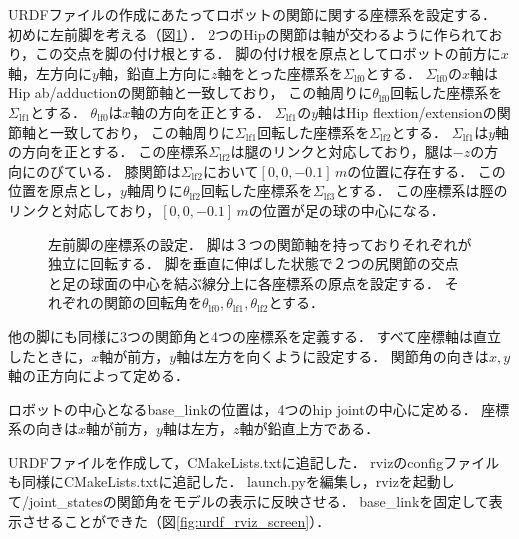 \documentclass[a4paper]{jlreq}
\begin{document}
  URDFファイルの作成にあたってロボットの関節に関する座標系を設定する．
  初めに左前脚を考える（図\ref{fig:lfleg_coords}）．
  2つのHipの関節は軸が交わるように作られており，この交点を脚の付け根とする．
  脚の付け根を原点としてロボットの前方に$x$軸，左方向に$y$軸，鉛直上方向に$z$軸をとった座標系を$\Sigma_\mathrm{lf0}$とする．
  $\Sigma_\mathrm{lf0}$の$x$軸はHip ab/adductionの関節軸と一致しており，
  この軸周りに$\theta_\mathrm{lf0}$回転した座標系を$\Sigma_\mathrm{lf1}$とする．
  $\theta_\mathrm{lf0}$は$x$軸の方向を正とする．
  $\Sigma_\mathrm{lf1}$の$y$軸はHip flextion/extensionの関節軸と一致しており，
  この軸周りに$\Sigma_\mathrm{lf1}$回転した座標系を$\Sigma_\mathrm{lf2}$とする．
  $\Sigma_\mathrm{lf1}$は$y$軸の方向を正とする．
  この座標系$\Sigma_\mathrm{lf2}$は腿のリンクと対応しており，腿は$-z$の方向にのびている．
  膝関節は$\Sigma_\mathrm{lf2}$において$[0, 0, -0.1]\,\si{m}$の位置に存在する．
  この位置を原点とし，$y$軸周りに$\theta_\mathrm{lf2}$回転した座標系を$\Sigma_\mathrm{lf3}$とする．
  この座標系は脛のリンクと対応しており，$[0, 0, -0.1]\,\si{m}$の位置が足の球の中心になる．

  \begin{figure}[htb]
    \centering
    
    \caption{
      左前脚の座標系の設定．
      脚は３つの関節軸を持っておりそれぞれが独立に回転する．
      脚を垂直に伸ばした状態で２つの尻関節の交点と足の球面の中心を結ぶ線分上に各座標系の原点を設定する．
      それぞれの関節の回転角を$\theta_\mathrm{lf0}, \theta_\mathrm{lf1}, \theta_\mathrm{lf2}$とする．
    }
    \label{fig:lfleg_coords}
  \end{figure}

  他の脚にも同様に3つの関節角と4つの座標系を定義する．
  すべて座標軸は直立したときに，$x$軸が前方，$y$軸は左方を向くように設定する．
  関節角の向きは$x, y$軸の正方向によって定める．

  ロボットの中心となるbase\_linkの位置は，4つのhip jointの中心に定める．
  座標系の向きは$x$軸が前方，$y$軸は左方，$z$軸が鉛直上方である．

  URDFファイルを作成して，CMakeLists.txtに追記した．
  rvizのconfigファイルも同様にCMakeLists.txtに追記した．
  launch.pyを編集し，rvizを起動して/joint\_statesの関節角をモデルの表示に反映させる．
  base\_linkを固定して表示させることができた（図\ref{fig:urdf_rviz_screen}）．
\end{document}
